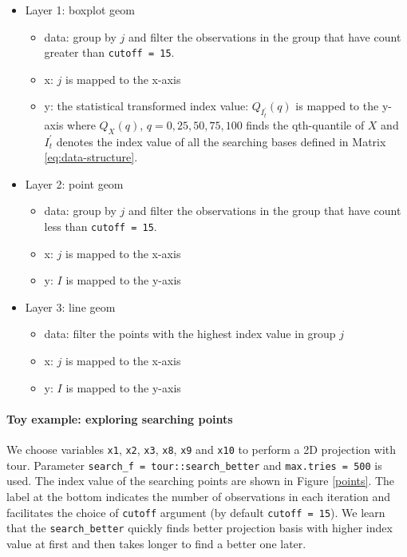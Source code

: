 \documentclass[12pt]{article}
\providecommand{\tightlist}{%
  \setlength{\itemsep}{0pt}\setlength{\parskip}{0pt}}
\begin{document}
\begin{itemize}
\tightlist
\item
  Layer 1: boxplot geom

  \begin{itemize}
  \tightlist
  \item
    data: group by \(j\) and filter the observations in the group that
    have count greater than \texttt{cutoff\ =\ 15}.
  \item
    x: \(j\) is mapped to the x-axis
  \item
    y: the statistical transformed index value: \(Q_{I^{\prime}_t}(q)\)
    is mapped to the y-axis where \(Q_X(q)\), \(q = 0, 25, 50, 75, 100\)
    finds the qth-quantile of \(X\) and \(I^{\prime}_t\) denotes the
    index value of all the searching bases defined in Matrix
    \ref{eq:data-structure}.
  \end{itemize}
\item
  Layer 2: point geom

  \begin{itemize}
  \tightlist
  \item
    data: group by \(j\) and filter the observations in the group that
    have count less than \texttt{cutoff\ =\ 15}.
  \item
    x: \(j\) is mapped to the x-axis
  \item
    y: \(I\) is mapped to the y-axis
  \end{itemize}
\item
  Layer 3: line geom

  \begin{itemize}
  \tightlist
  \item
    data: filter the points with the highest index value in group \(j\)
  \item
    x: \(j\) is mapped to the x-axis
  \item
    y: \(I\) is mapped to the y-axis
  \end{itemize}
\end{itemize}

\hypertarget{toy-example-exploring-searching-points}{%
\paragraph{Toy example: exploring searching
points}\label{toy-example-exploring-searching-points}}

We choose variables \texttt{x1}, \texttt{x2}, \texttt{x3}, \texttt{x8},
\texttt{x9} and \texttt{x10} to perform a 2D projection with tour.
Parameter \texttt{search\_f\ =\ tour::search\_better} and
\texttt{max.tries\ =\ 500} is used. The index value of the searching
points are shown in Figure \ref{points}. The label at the bottom
indicates the number of observations in each iteration and facilitates
the choice of \texttt{cutoff} argument (by default
\texttt{cutoff\ =\ 15}). We learn that the \texttt{search\_better}
quickly finds better projection basis with higher index value at first
and then takes longer to find a better one later.
\end{document}
